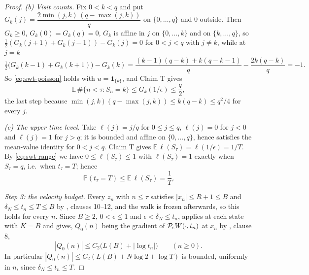 \begin{proof}
\emph{(b) Visit counts.} Fix $0<k<q$ and put
$G_k(j)=\dfrac{2\min(j,k)\,(q-\max(j,k))}{q}$ on $\{0,\ldots,q\}$ and $0$
outside. Then $G_k\ge0$, $G_k(0)=G_k(q)=0$, $G_k$ is affine in $j$ on
$\{0,\ldots,k\}$ and on $\{k,\ldots,q\}$, so
$\tfrac12(G_k(j+1)+G_k(j-1))-G_k(j)=0$ for $0<j<q$ with $j\ne k$, while at
$j=k$
\[
  \tfrac12\bigl(G_k(k-1)+G_k(k+1)\bigr)-G_k(k)
  =\frac{(k-1)(q-k)+k(q-k-1)}{q}-\frac{2k(q-k)}{q}=-1 .
\]
So \eqref{eq:swt-poisson} holds with $u=\mathbf1_{\{k\}}$, and Claim T gives
\begin{equation}\label{eq:swt-visits}
  \mathbb E\,\#\{n<\tau:S_n=k\}\le G_k(1/\epsilon)\le\frac q2 ,
\end{equation}
the last step because
$\min(j,k)(q-\max(j,k))\le k(q-k)\le q^2/4$ for every $j$.

\emph{(c) The upper time level.} Take $\ell(j)=j/q$ for $0\le j\le q$,
$\ell(j)=0$ for $j<0$ and $\ell(j)=1$ for $j>q$; it is bounded and affine on
$\{0,\dots,q\}$, hence satisfies the mean-value identity for $0<j<q$. Claim T
gives $\mathbb E\,\ell(S_\tau)=\ell(1/\epsilon)=1/T$. By \eqref{eq:swt-range}
we have $0\le\ell(S_\tau)\le1$ with $\ell(S_\tau)=1$ exactly when $S_\tau=q$,
i.e.\ when $t_\tau=T$; hence
\begin{equation}\label{eq:swt-upper}
  \mathbb P(t_\tau=T)\le\mathbb E\,\ell(S_\tau)=\frac1T .
\end{equation}

\emph{Step 3: the velocity budget.}
Every $z_n$ with $n\le\tau$ satisfies $|x_n|\le R+1\le B$ and
$\delta_N\le t_n\le T\le B$ by , clauses 10--12, and the
walk is frozen afterwards, so this holds for every $n$. Since $B\ge2$,
$0<\epsilon\le1$ and $\epsilon<\delta_N\le t_n$, 
applies at each state with $K=B$ and gives, $Q_0(n)$ being the gradient of
$\mathcal{P}_\epsilon W(\cdot,t_n)$ at $x_n$ by , clause 8,
\begin{equation}\label{eq:swt-Q0}
  |Q_0(n)|\le C_2\bigl(L(B)+|\log t_n|\bigr)\qquad(n\ge0).
\end{equation}
In particular $|Q_0(n)|\le C_2(L(B)+N\log2+\log T)$ is bounded, uniformly in
$n$, since $\delta_N\le t_n\le T$.


\end{proof}
